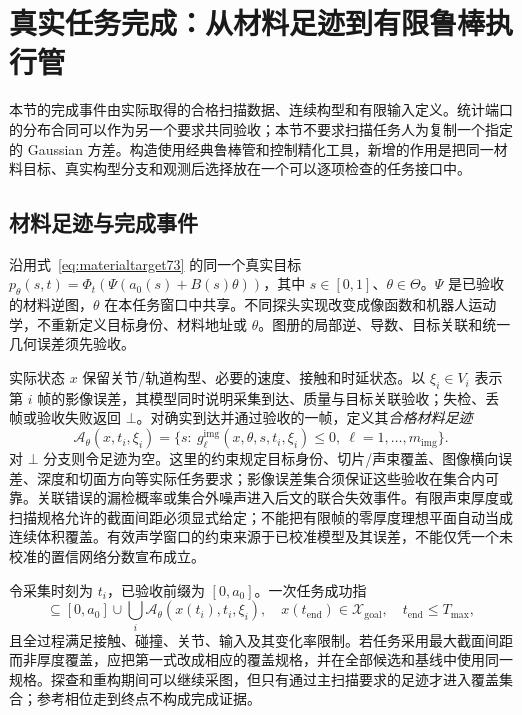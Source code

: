 \documentclass[UTF8,fontset=fandol,zihao=5,a4paper]{ctexart}
\newcommand{\R}{\mathbb R}\newcommand{\N}{\mathcal N}
\theoremstyle{definition}
\theoremstyle{remark}\newtheorem{remark}[theorem]{说明}
\numberwithin{equation}{section}
\begin{document}

\section{真实任务完成：从材料足迹到有限鲁棒执行管}
\label{sec:physical-completion}

本节的完成事件由实际取得的合格扫描数据、连续构型和有限输入定义。统计端口的分布合同可以作为另一个要求共同验收；本节不要求扫描任务人为复制一个指定的 Gaussian 方差。构造使用经典鲁棒管和控制精化工具，新增的作用是把同一材料目标、真实构型分支和观测后选择放在一个可以逐项检查的任务接口中。

\subsection{材料足迹与完成事件}

沿用式~\eqref{eq:materialtarget73} 的同一个真实目标
\(p_\theta(s,t)=\Phi_t(\Psi(a_0(s)+B(s)\theta))\)，其中 \(s\in[0,1]\)、\(\theta\in\Theta\)。\(\Psi\) 是已验收的材料逆图，\(\theta\) 在本任务窗口中共享。不同探头实现改变成像函数和机器人运动学，不重新定义目标身份、材料地址或 \(\theta\)。图册的局部逆、导数、目标关联和统一几何误差须先验收。

实际状态 \(x\) 保留关节/轨道构型、必要的速度、接触和时延状态。以 \(\xi_i\in V_i\) 表示第 \(i\) 帧的影像误差，其模型同时说明采集到达、质量与目标关联验收；失检、丢帧或验收失败返回 \(\bot\)。对确实到达并通过验收的一帧，定义其\emph{合格材料足迹}
\begin{equation}
\mathcal A_\theta(x,t_i,\xi_i)
=\{s:\ g_\ell^{\mathrm{img}}(x,\theta,s,t_i,\xi_i)\le0,
\ \ell=1,\ldots,m_{\mathrm{img}}\}.
\label{eq:material-footprint}
\end{equation}
对 \(\bot\) 分支则令足迹为空。这里的约束规定目标身份、切片/声束覆盖、图像横向误差、深度和切面方向等实际任务要求；影像误差集合须保证这些验收在集合内可靠。关联错误的漏检概率或集合外噪声进入后文的联合失效事件。有限声束厚度或扫描规格允许的截面间距必须显式给定；不能把有限帧的零厚度理想平面自动当成连续体积覆盖。有效声学窗口的约束来源于已校准模型及其误差，不能仅凭一个未校准的置信网络分数宣布成立。

令采集时刻为 \(t_i\)，已验收前缀为 \([0,a_0]\)。一次任务成功指
\begin{equation}
[0,1]\subseteq[0,a_0]\cup\bigcup_i\mathcal A_\theta(x(t_i),t_i,\xi_i),
\quad x(t_{\mathrm{end}})\in\mathcal X_{\mathrm{goal}},
\quad t_{\mathrm{end}}\le T_{\max},
\label{eq:physical-success}
\end{equation}
且全过程满足接触、碰撞、关节、输入及其变化率限制。若任务采用最大截面间距而非厚度覆盖，应把第一式改成相应的覆盖规格，并在全部候选和基线中使用同一规格。探查和重构期间可以继续采图，但只有通过主扫描要求的足迹才进入覆盖集合；参考相位走到终点不构成完成证据。
\end{document}
